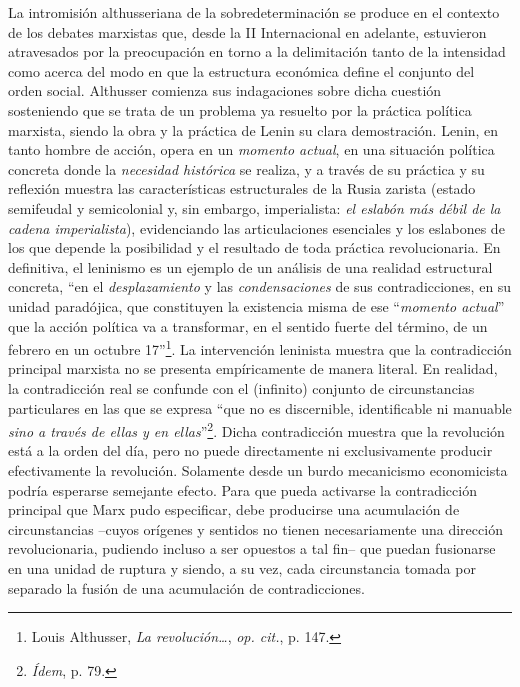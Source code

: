 La intromisión althusseriana de la sobredeterminación se produce en el
contexto de los debates marxistas que, desde la II Internacional en
adelante, estuvieron atravesados por la preocupación en torno a la
delimitación tanto de la intensidad como acerca del modo en que la
estructura económica define el conjunto del orden social. Althusser
comienza sus indagaciones sobre dicha cuestión sosteniendo que se trata
de un problema ya resuelto por la práctica política marxista, siendo la
obra y la práctica de Lenin su clara demostración. Lenin, en tanto
hombre de acción, opera en un \emph{momento actual}, en una situación
política concreta donde la \emph{necesidad histórica} se realiza, y a
través de su práctica y su reflexión muestra las características
estructurales de la Rusia zarista (estado semifeudal y semicolonial y,
sin embargo, imperialista: \emph{el eslabón más débil de la cadena
imperialista}), evidenciando las articulaciones esenciales y los
eslabones de los que depende la posibilidad y el resultado de toda
práctica revolucionaria. En definitiva, el leninismo es un ejemplo de un
análisis de una realidad estructural concreta, \enquote{en el
\emph{desplazamiento} y las \emph{condensaciones} de sus
contradicciones, en su unidad paradójica, que constituyen la existencia
misma de ese ``\emph{momento actual}'' que la acción política va a
transformar, en el sentido fuerte del término, de un febrero en un
octubre 17}\footnote{Louis Althusser, \emph{La revolución\ldots{}},
  \emph{op. cit.}, p. 147.}. La intervención leninista muestra que la
contradicción principal marxista no se presenta empíricamente de manera
literal. En realidad, la contradicción real se confunde con el
(infinito) conjunto de circunstancias particulares en las que se expresa
\enquote{que no es discernible, identificable ni manuable \emph{sino a través de
ellas y en ellas}}\footnote{\emph{Ídem}, p. 79.}. Dicha contradicción
muestra que la revolución está a la orden del día, pero no puede
directamente ni exclusivamente producir efectivamente la revolución.
Solamente desde un burdo mecanicismo economicista podría esperarse
semejante efecto. Para que pueda activarse la contradicción principal
que Marx pudo especificar, debe producirse una acumulación de
circunstancias --cuyos orígenes y sentidos no tienen necesariamente una
dirección revolucionaria, pudiendo incluso a ser opuestos a tal fin--
que puedan fusionarse en una unidad de ruptura y siendo, a su vez, cada
circunstancia tomada por separado la fusión de una acumulación de
contradicciones.

